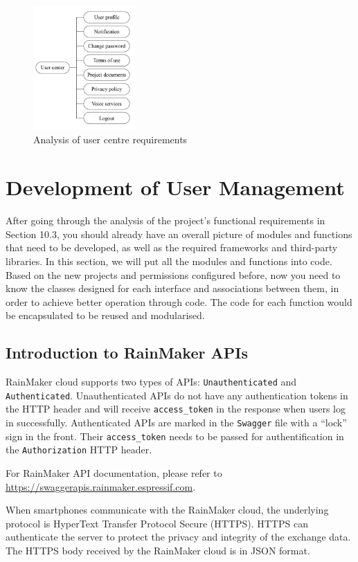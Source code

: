 \documentclass[a4paper,12pt,openany]{book}
\begin{document}
\begin{figure}[ht]
    \centering
    \includegraphics[width=0.35\textwidth]{D10Z/10-17}
    \caption{Analysis of user centre requirements}
\end{figure}

\section{Development of User Management}
After going through the analysis of the project’s functional requirements in Section 10.3, you should already have an overall picture of modules and functions that need to be developed, as well as the required frameworks and third-party libraries. In this section, we will put all the modules and functions into code. Based on the new projects and permissions configured before, now you need to know the classes designed for each interface and associations between them, in order to achieve better operation through code. The code for each function would be encapsulated to be reused and modularised.

\subsection{Introduction to RainMaker APIs}
RainMaker cloud supports two types of APIs: \verb|Unauthenticated| and \verb|Authenticated|. Unauthenticated APIs do not have any authentication tokens in the HTTP header and will receive \verb|access_token| in the response when users log in successfully. Authenticated APIs are marked in the \verb|Swagger| file with a “lock” sign in the front. Their \verb|access_token| needs to be passed for authentification in the \verb|Authorization| HTTP header.

For RainMaker API documentation, please refer to \url{https://swaggerapis.rainmaker.espressif.com}.

When smartphones communicate with the RainMaker cloud, the underlying protocol is HyperText Transfer Protocol Secure (HTTPS). HTTPS can authenticate the server to protect the privacy and integrity of the exchange data. The HTTPS body received by the RainMaker cloud is in JSON format.
\end{document}

